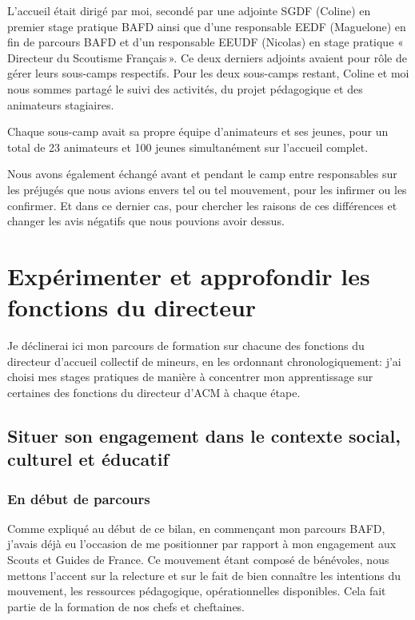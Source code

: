 \documentclass[titlepage,11pt,a4paper]{article}
\begin{document}
L'accueil était dirigé par moi, secondé par une adjointe SGDF (Coline) en premier stage pratique BAFD
ainsi que d'une responsable EEDF (Maguelone) en fin de parcours BAFD et d'un responsable
EEUDF (Nicolas) en stage pratique «\,Directeur du Scoutisme Français\,».
Ce deux derniers adjoints avaient pour rôle de gérer leurs sous-camps respectifs.
Pour les deux sous-camps restant, Coline et moi nous sommes partagé le suivi des activités, du
projet pédagogique et des animateurs stagiaires.

Chaque sous-camp avait sa propre équipe d'animateurs et ses jeunes, pour un total de 23
animateurs et 100 jeunes simultanément sur l'accueil complet.

Nous avons également échangé avant et pendant le camp entre responsables sur les préjugés
que nous avions envers tel ou tel mouvement, pour les infirmer ou les confirmer. Et dans
ce dernier cas, pour chercher les raisons de ces différences et changer les avis négatifs
que nous pouvions avoir dessus.

\section{Expérimenter et approfondir les fonctions du directeur}

Je déclinerai ici mon parcours de formation sur chacune des fonctions du directeur
d'accueil collectif de mineurs, en les ordonnant chronologiquement: j'ai choisi mes stages
pratiques de manière à concentrer mon apprentissage sur certaines des fonctions du directeur d’ACM à
chaque étape.

\subsection{Situer son engagement dans le contexte social, culturel et éducatif}
\subsubsection{En début de parcours}

Comme expliqué au début de ce bilan, en commençant mon parcours BAFD, j'avais déjà eu
l'occasion de me positionner par rapport à mon engagement aux Scouts et Guides de France.
Ce mouvement étant composé de bénévoles, nous mettons l'accent sur la relecture et sur le
fait de bien connaître les intentions du mouvement, les ressources pédagogique,
opérationnelles disponibles. Cela fait partie de la formation de nos chefs et cheftaines.
\end{document}
